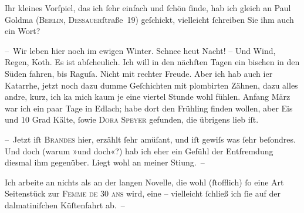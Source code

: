 \pstart
           Ihr kleines Vorſpiel, das ich{ }ſehr einfach und{ }ſchön finde, hab ich gleich an Paul Goldma{\geminationn} (\textsc{Berlin}, \textsc{Dessauer}ſtraße 19) geſchickt, vielleicht{ }ſchreiben
               Sie ihm auch ein Wort?\pend
           
\pstart
           – Wir leben hier noch im ewigen {\pb}Winter. Schnee heut
               Nacht! – Und Wind, Regen, Koth. Es ist abſcheulich. Ich will in den nächſten Tagen
               ein bischen in den Süden fahren, bis Raguſa.
               Nicht mit rechter Freude. Aber ich hab auch i{\geminationm}er
               Katarrhe, jetzt noch dazu dumme Geſchichten mit plombirten Zähnen, dazu alles andre,
               kurz, ich ka{\geminationn}{ }{\pb}mich kaum je eine viertel Stunde wohl fühlen.
                  Anfang März war ich ein paar Tage in Edlach; habe dort den Frühling finden wollen, aber Eis und 10 Grad Kälte,{ }ſowie \textsc{Dora Speyer} gefunden, die übrigens lieb iſt.\pend
           
\pstart
           – Jetzt iſt \textsc{Brandes} hier, erzählt{ }ſehr amüſant, und iſt gewiſs was{ }ſehr beſondres. Und {\pb}doch (warum »und doch«?) hab ich eher ein Gefühl der
               Entfremdung diesmal ihm gegenüber. Liegt wohl an meiner Sti{\geminationm}ung. –\pend
           
\pstart
           Ich arbeite an nichts als an der langen Novelle, die wohl (ſtofflich){ }ſo eine Art Seitenstück zur
                  \textsc{Femme de 30 ans} wird, eine \label{K_L01024-2v}\label{K_L01024-2}
               – viel{\pb}leicht{ }ſchließ ich{ }ſie auf der dalmatiniſchen Küſtenfahrt ab. –\pend
           

